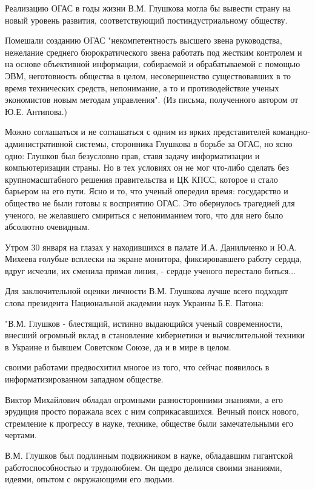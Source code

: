 \documentclass{article}
\begin{document}
Реализацию ОГАС в годы жизни В.М. Глушкова могла бы вывести страну на новый
уровень развития, соответствующий постиндустриальному обществу.

Помешали созданию ОГАС "некомпетентность высшего звена руководства, нежелание
среднего бюрократического звена работать под жестким контролем и на основе
объективной информации, собираемой и обрабатываемой с помощью ЭВМ, неготовность
общества в целом, несовершенство существовавших в то время технических средств,
непонимание, а то и противодействие ученых экономистов новым методам
управления". (Из письма, полученного автором от Ю.Е. Антипова.)

Можно соглашаться и не соглашаться с одним из ярких представителей
командно-административной системы, сторонника Глушкова в борьбе за ОГАС, но ясно
одно: Глушков был безусловно прав, ставя задачу информатизации и компьютеризации
страны. Но в тех условиях он не мог что-либо сделать без крупномасштабного
решения правительства и ЦК КПСС, которое и стало барьером на его пути. Ясно и
то, что ученый опередил время: государство и общество не были готовы к
восприятию ОГАС. Это обернулось трагедией для ученого, не желавшего смириться с
непониманием того, что для него было абсолютно очевидным.

Утром 30 января на глазах у находившихся в палате И.А. Данильченко и Ю.А.
Михеева голубые всплески на экране монитора, фиксировавшего работу сердца, вдруг
исчезли, их сменила прямая линия, - сердце ученого перестало биться...

Для заключительной оценки личности В.М. Глушкова лучше всего подходят слова
президента Национальной академии наук Украины Б.Е. Патона:

"В.М. Глушков - блестящий, истинно выдающийся ученый современности, внесший
огромный вклад в становление кибернетики и вычислительной техники в Украине и
бывшем Советском Союзе, да и в мире в целом.

своими работами предвосхитил многое из того, что сейчас появилось в
информатизированном западном обществе.

Виктор Михайлович обладал огромными разносторонними знаниями, а его эрудиция
просто поражала всех с ним соприкасавшихся. Вечный поиск нового, стремление к
прогрессу в науке, технике, обществе были замечательными его чертами.

В.М. Глушков был подлинным подвижником в науке, обладавшим гигантской
работоспособностью и трудолюбием. Он щедро делился своими знаниями, идеями,
опытом с окружающими его людьми.
\end{document}
